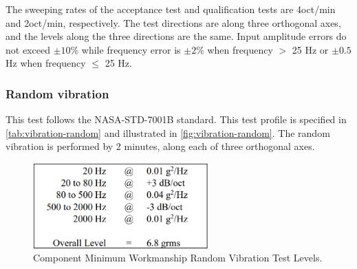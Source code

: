 The sweeping rates of the acceptance test and qualification tests are 4oct/min and 2oct/min, respectively. The test directions are along three orthogonal axes, and the levels along the three directions are the same. Input amplitude errors do not exceed $\pm 10$\% while frequency error is $\pm2$\% when frequency $>$ 25 Hz or $\pm0.5$ Hz when frequency $\leq$ 25 Hz.



\subsubsection{Random vibration}

 This test follows the NASA-STD-7001B standard. This test profile is specified in \autoref{tab:vibration-random} and illustrated in \autoref{fig:vibration-random}. The random vibration is performed by 2 minutes, along each of three orthogonal axes.

\begin{figure}[!htb]
    \begin{center}
        \includegraphics[width=0.6\textwidth]{figures/random-vibration.png}
        \caption{Component Minimum Workmanship Random Vibration Test Levels.}
        \label{tab:vibration-random}
    \end{center}
\end{figure}

